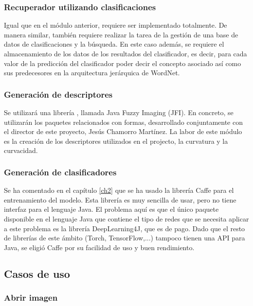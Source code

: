 \subsubsection{Recuperador utilizando clasificaciones}

Igual que en el módulo anterior, requiere ser implementado totalmente. De manera similar, también requiere realizar la tarea de la gestión de una base de datos de clasificaciones y la búsqueda. En este caso además, se requiere el almacenamiento de los datos de los resultados del clasificador, es decir, para cada valor de la predicción del clasificador poder decir el concepto asociado así como sus predecesores en la arquitectura jerárquica de WordNet.\\

\subsubsection{Generación de descriptores}

Se utilizará una librería , llamada Java Fuzzy Imaging (JFI). En concreto, se utilizarán los paquetes relacionados con formas, desarrollado conjuntamente con el director de este proyecto, Jesús Chamorro Martínez. La labor de este módulo es la creación de los descriptores utilizados en el projecto, la curvatura y la curvacidad.\\
  
\subsubsection{Generación de clasificadores}

Se ha comentado en el capítulo \ref{ch2} que se ha usado la librería Caffe para el entrenamiento del modelo. Esta librería es muy sencilla de usar, pero no tiene interfaz para el lenguaje Java. El problema aquí es que el único paquete disponible en el lenguaje Java que contiene el tipo de redes que se necesita aplicar a este problema es la librería DeepLearning4J, que es de pago. Dado que el resto de librerías de este ámbito (Torch, TensorFlow,...) tampoco tienen una API para Java, se eligió Caffe por su facilidad de uso y buen rendimiento.\\

\subsection{Casos de uso}

\subsubsection{Abrir imagen}

